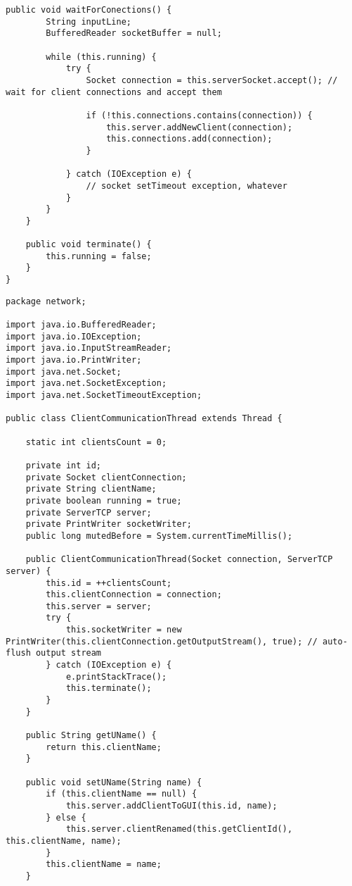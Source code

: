 \begin{enumerate}
\begin{lstlisting}[style=java]
    public void waitForConections() {
        String inputLine;
        BufferedReader socketBuffer = null;

        while (this.running) {
            try {
                Socket connection = this.serverSocket.accept(); // wait for client connections and accept them

                if (!this.connections.contains(connection)) {
                    this.server.addNewClient(connection);
                    this.connections.add(connection);
                }

            } catch (IOException e) {
                // socket setTimeout exception, whatever
            }
        }
    }

    public void terminate() {
        this.running = false;
    }
}

\end{lstlisting}

\begin{lstlisting}[style=java]
package network;

import java.io.BufferedReader;
import java.io.IOException;
import java.io.InputStreamReader;
import java.io.PrintWriter;
import java.net.Socket;
import java.net.SocketException;
import java.net.SocketTimeoutException;

public class ClientCommunicationThread extends Thread {

    static int clientsCount = 0;

    private int id;
    private Socket clientConnection;
    private String clientName;
    private boolean running = true;
    private ServerTCP server;
    private PrintWriter socketWriter;
    public long mutedBefore = System.currentTimeMillis();

    public ClientCommunicationThread(Socket connection, ServerTCP server) {
        this.id = ++clientsCount;
        this.clientConnection = connection;
        this.server = server;
        try {
            this.socketWriter = new PrintWriter(this.clientConnection.getOutputStream(), true); // auto-flush output stream
        } catch (IOException e) {
            e.printStackTrace();
            this.terminate();
        }
    }

    public String getUName() {
        return this.clientName;
    }

    public void setUName(String name) {
        if (this.clientName == null) {
            this.server.addClientToGUI(this.id, name);
        } else {
            this.server.clientRenamed(this.getClientId(), this.clientName, name);
        }
        this.clientName = name;
    }


\end{lstlisting}
\end{enumerate}
